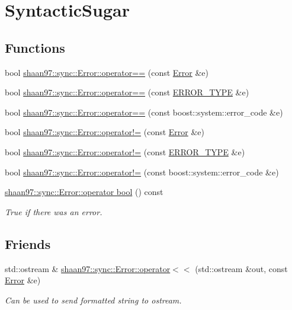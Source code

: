 \hypertarget{group___syntactic_sugar}{}\section{Syntactic\+Sugar}
\label{group___syntactic_sugar}
\subsection*{Functions}
\begin{DoxyCompactItemize}
\item 
bool \hyperlink{group___syntactic_sugar_ga54d9f727bc1777cb9485765b070f0f97}{shaan97\+::sync\+::\+Error\+::operator==} (const \hyperlink{classshaan97_1_1sync_1_1_error}{Error} \&e)
\item 
bool \hyperlink{group___syntactic_sugar_gaece1c258e0e4bcfba00769313c8370ad}{shaan97\+::sync\+::\+Error\+::operator==} (const \hyperlink{namespaceshaan97_1_1sync_a69f4d5572314be52626f6a1c8ecc8db9}{E\+R\+R\+O\+R\+\_\+\+T\+Y\+PE} \&e)
\item 
bool \hyperlink{group___syntactic_sugar_ga46d610d78d061c030e562563f947e196}{shaan97\+::sync\+::\+Error\+::operator==} (const boost\+::system\+::error\+\_\+code \&e)
\item 
bool \hyperlink{group___syntactic_sugar_ga43ee206eb49d8427e6c85ed7a4e2f62d}{shaan97\+::sync\+::\+Error\+::operator!=} (const \hyperlink{classshaan97_1_1sync_1_1_error}{Error} \&e)
\item 
bool \hyperlink{group___syntactic_sugar_ga93d2c3b440e64d2c2e5385989af96d16}{shaan97\+::sync\+::\+Error\+::operator!=} (const \hyperlink{namespaceshaan97_1_1sync_a69f4d5572314be52626f6a1c8ecc8db9}{E\+R\+R\+O\+R\+\_\+\+T\+Y\+PE} \&e)
\item 
bool \hyperlink{group___syntactic_sugar_ga67831fc5e4cef9661a5158acdb33da25}{shaan97\+::sync\+::\+Error\+::operator!=} (const boost\+::system\+::error\+\_\+code \&e)
\item 
\hyperlink{group___syntactic_sugar_gaba6a2a8da1a2771f4a007020eb27b256}{shaan97\+::sync\+::\+Error\+::operator bool} () const
\begin{DoxyCompactList}\small\item\em True if there was an error. \end{DoxyCompactList}\end{DoxyCompactItemize}
\subsection*{Friends}
\begin{DoxyCompactItemize}
\item 
std\+::ostream \& \hyperlink{group___syntactic_sugar_ga988539f900b9f29d5444b633f0857347}{shaan97\+::sync\+::\+Error\+::operator$<$$<$} (std\+::ostream \&out, const \hyperlink{classshaan97_1_1sync_1_1_error}{Error} \&e)
\begin{DoxyCompactList}\small\item\em Can be used to send formatted string to ostream. \end{DoxyCompactList}\end{DoxyCompactItemize}


